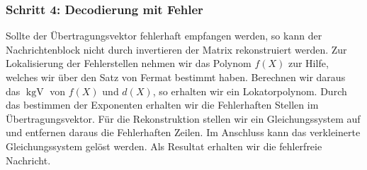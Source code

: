 \subsubsection{Schritt 4: Decodierung mit Fehler}
Sollte der Übertragungsvektor fehlerhaft empfangen werden, so kann der Nachrichtenblock nicht durch invertieren der Matrix rekonstruiert werden.
Zur Lokalisierung der Fehlerstellen nehmen wir das Polynom $f(X)$ zur Hilfe, welches wir über den Satz von Fermat bestimmt haben.
Berechnen wir daraus das $\operatorname{kgV}$ von $f(X)$ und $d(X)$, so erhalten wir ein Lokatorpolynom.
Durch das bestimmen der Exponenten erhalten wir die Fehlerhaften Stellen im Übertragungsvektor.
Für die Rekonstruktion stellen wir ein Gleichungssystem auf und entfernen daraus die Fehlerhaften Zeilen.
Im Anschluss kann das verkleinerte Gleichungssystem gelöst werden. 
Als Resultat erhalten wir die fehlerfreie Nachricht.
